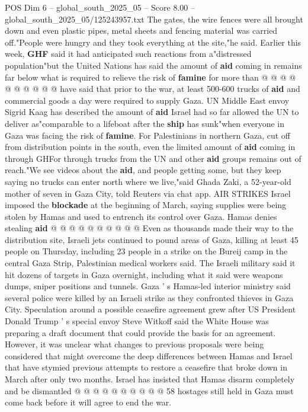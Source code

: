 \begin{textsample}{POS Dim 6 – global\_south\_2025\_05 – Score 8.00 – global\_south\_2025\_05/125243957.txt}
The gates, the wire fences were all brought down and even plastic pipes, metal sheets and fencing material was carried off."People were hungry and they took everything at the site,"he said.
Earlier this week, \textbf{GHF} said it had anticipated such reactions from a"distressed population"but the United Nations has said the amount of \textbf{aid} coming in remains far below what is required to relieve the risk of \textbf{famine} for more than @ @ @ @ @ @ @ @ @ @ have said that prior to the war, at least 500-600 trucks of \textbf{aid} and commercial goods a day were required to supply Gaza.
UN Middle East envoy Sigrid Kaag has described the amount of \textbf{aid} Israel had so far allowed the UN to deliver as"comparable to a lifeboat after the \textbf{ship} has sunk"when everyone in Gaza was facing the risk of \textbf{famine}.
For Palestinians in northern Gaza, cut off from distribution points in the south, even the limited amount of \textbf{aid} coming in through GHFor through trucks from the UN and other \textbf{aid} groups remains out of reach."We see videos about the \textbf{aid}, and people getting some, but they keep saying no trucks can enter north where we live,"said Ghada Zaki, a 52-year-old mother of seven in Gaza City, told Reuters via chat app.
AIR STRIKES Israel imposed the \textbf{blockade} at the beginning of March, saying supplies were being stolen by Hamas and used to entrench its control over Gaza.
Hamas denies stealing \textbf{aid} @ @ @ @ @ @ @ @ @ @ Even as thousands made their way to the distribution site, Israeli jets continued to pound areas of Gaza, killing at least 45 people on Thursday, including 23 people in a strike on the Bureij camp in the central Gaza Strip, Palestinian medical workers said.
The Israeli military said it hit dozens of targets in Gaza overnight, including what it said were weapons dumps, sniper positions and tunnels.
Gaza ' s Hamas-led interior ministry said several police were killed by an Israeli strike as they confronted thieves in Gaza City.
Speculation around a possible ceasefire agreement grew after US President Donald Trump ' s special envoy Steve Witkoff said the White House was preparing a draft document that could provide the basis for an agreement.
However, it was unclear what changes to previous proposals were being considered that might overcome the deep differences between Hamas and Israel that have stymied previous attempts to restore a ceasefire that broke down in March after only two months.
Israel has insisted that Hamas disarm completely and be dismantled @ @ @ @ @ @ @ @ @ @ 58 hostages still held in Gaza must come back before it will agree to end the war.

\end{textsample}
